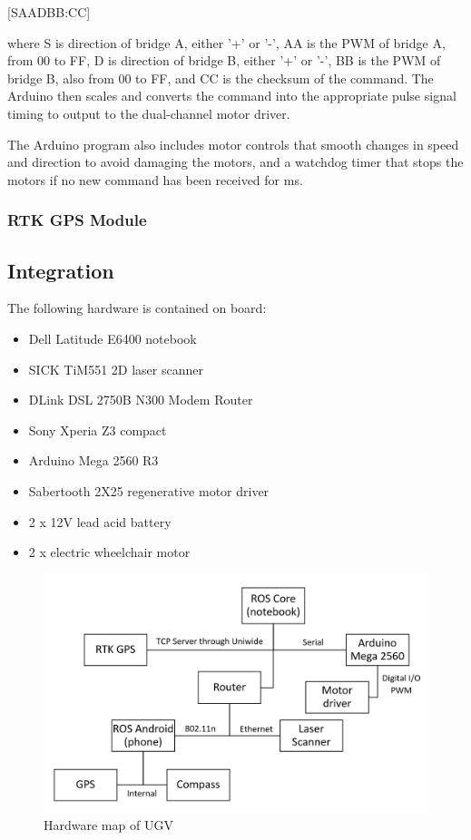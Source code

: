 \documentclass[titlepage,12pt,a4paper]{article}
\begin{document}
\begin{center}
	[SAADBB:CC]
\end{center}

where S is direction of bridge A, either '+' or '-', AA is the PWM of bridge A, from 00 to FF, D is direction of bridge B, either '+' or '-', BB is the PWM of bridge B, also from 00 to FF, and CC is the checksum of the command. The Arduino then scales and converts the command into the appropriate pulse signal timing to output to the dual-channel motor driver.

The Arduino program also includes motor controls that smooth changes in speed and direction to avoid damaging the motors, and a watchdog timer that stops the motors if no new command has been received for \unit[500]{ms}.

\subsubsection{RTK GPS Module}



\subsection{Integration}

The following hardware is contained on board:

\begin{itemize}
	\item Dell Latitude E6400 notebook
	\item SICK TiM551 2D laser scanner
	\item DLink DSL 2750B N300 Modem Router
	\item Sony Xperia Z3 compact
	\item Arduino Mega 2560 R3
	\item Sabertooth 2X25 regenerative motor driver
	\item 2 x 12V lead acid battery
	\item 2 x electric wheelchair motor
\end{itemize}

\begin{figure}[h!]
	\centering
	\includegraphics[scale=0.6]{figures/hardware_chart.png}
	\caption{Hardware map of UGV}
	\label{figure:hardware_chart}
\end{figure}
\end{document}
